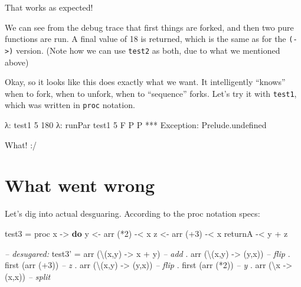 \documentclass[]{article}
\newenvironment{Shaded}{}{}
\newcommand{\KeywordTok}[1]{\textcolor[rgb]{0.00,0.44,0.13}{\textbf{{#1}}}}
\newcommand{\DataTypeTok}[1]{\textcolor[rgb]{0.56,0.13,0.00}{{#1}}}
\newcommand{\DecValTok}[1]{\textcolor[rgb]{0.25,0.63,0.44}{{#1}}}
\newcommand{\CommentTok}[1]{\textcolor[rgb]{0.38,0.63,0.69}{\textit{{#1}}}}
\newcommand{\OtherTok}[1]{\textcolor[rgb]{0.00,0.44,0.13}{{#1}}}
\newcommand{\FunctionTok}[1]{\textcolor[rgb]{0.02,0.16,0.49}{{#1}}}
\newcommand{\NormalTok}[1]{{#1}}
\begin{document}
That works as expected!

We can see from the debug trace that first things are forked, and then two pure
functions are run. A final value of 18 is returned, which is the same as for the
\texttt{(-\textgreater{})} version. (Note how we can use \texttt{test2} as both,
due to what we mentioned above)

Okay, so it looks like this does exactly what we want. It intelligently
``knows'' when to fork, when to unfork, when to ``sequence'' forks. Let's try it
with \texttt{test1}, which was written in \texttt{proc} notation.

\begin{Shaded}
\begin{Highlighting}[]
\NormalTok{λ}\FunctionTok{:} \NormalTok{test1 }\DecValTok{5}
\DecValTok{180}
\NormalTok{λ}\FunctionTok{:} \NormalTok{runPar test1 }\DecValTok{5}
\DataTypeTok{F}
\DataTypeTok{P}
\DataTypeTok{P}
\FunctionTok{***} \DataTypeTok{Exception}\FunctionTok{:} \NormalTok{Prelude.undefined}
\end{Highlighting}
\end{Shaded}

What! :/

\section{What went wrong}\label{what-went-wrong}

Let's dig into actual desguaring. According to the proc notation specs:

\begin{Shaded}
\begin{Highlighting}[]
\NormalTok{test3 }\FunctionTok{=} \NormalTok{proc x }\OtherTok{->} \KeywordTok{do}
    \NormalTok{y }\OtherTok{<-} \NormalTok{arr (}\FunctionTok{*}\DecValTok{2}\NormalTok{) }\FunctionTok{-<} \NormalTok{x}
    \NormalTok{z }\OtherTok{<-} \NormalTok{arr (}\FunctionTok{+}\DecValTok{3}\NormalTok{) }\FunctionTok{-<} \NormalTok{x}
    \NormalTok{returnA }\FunctionTok{-<} \NormalTok{y }\FunctionTok{+} \NormalTok{z}

\CommentTok{-- desugared:}
\NormalTok{test3' }\FunctionTok{=} \NormalTok{arr (\textbackslash{}(x,y) }\OtherTok{->} \NormalTok{x }\FunctionTok{+} \NormalTok{y)     }\CommentTok{-- add}
       \FunctionTok{.} \NormalTok{arr (\textbackslash{}(x,y) }\OtherTok{->} \NormalTok{(y,x))     }\CommentTok{-- flip}
       \FunctionTok{.} \NormalTok{first (arr (}\FunctionTok{+}\DecValTok{3}\NormalTok{))          }\CommentTok{-- z}
       \FunctionTok{.} \NormalTok{arr (\textbackslash{}(x,y) }\OtherTok{->} \NormalTok{(y,x))     }\CommentTok{-- flip}
       \FunctionTok{.} \NormalTok{first (arr (}\FunctionTok{*}\DecValTok{2}\NormalTok{))          }\CommentTok{-- y}
       \FunctionTok{.} \NormalTok{arr (\textbackslash{}x }\OtherTok{->} \NormalTok{(x,x))         }\CommentTok{-- split}
\end{Highlighting}
\end{Shaded}
\end{document}
